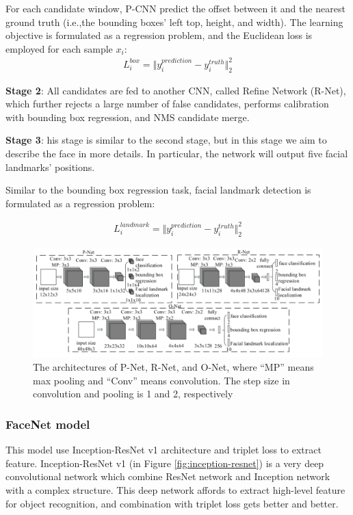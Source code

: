 \documentclass[journal, twocolumn]{IEEEtran}
\begin{document}
For each candidate window, P-CNN predict the offset between it and the nearest ground truth (i.e.,the bounding boxes’ left top, height, and width). The learning objective is formulated as a regression problem, and  the Euclidean loss is employed for each sample $x_i$:
\begin{align}
	L_i^{box} = \Vert y_i^{prediction} - y_i^{truth} \Vert _2^2
\end{align}
		
\textbf{Stage 2}: All candidates are fed to another CNN, called Refine Network (R-Net), which further rejects a large number of false candidates, performs calibration with bounding box regression, and NMS candidate merge.

\textbf{Stage 3}: his stage is similar to the second stage, but in this stage we aim to describe the face in more details. In particular, the network will output five facial landmarks’ positions.

Similar to the bounding box regression task, facial landmark detection is formulated as a regression problem: 

\begin{align}
	L_i^{landmark} = \Vert y_i^{prediction} - y_i^{truth} \Vert _2^2
\end{align}

\begin{figure}
    \centering
    \includegraphics[width=1\linewidth]{img/mtcnn_arch.png}
	\caption{The architectures of P-Net, R-Net, and O-Net, where “MP” means max pooling and “Conv” means convolution. The step size in convolution and pooling
is 1 and 2, respectively}\label{fig:mtcnn-arch}
\end{figure}


\subsubsection{FaceNet model} 
This model use Inception-ResNet v1 architecture \cite{ref:in-res} and triplet loss to extract feature. Inception-ResNet v1 (in Figure \ref{fig:inception-resnet}) is a very deep convolutional network which combine ResNet network and Inception network with a complex structure. This deep network affords to extract high-level feature for object recognition, and combination with triplet loss gets better and better. 
\end{document}
